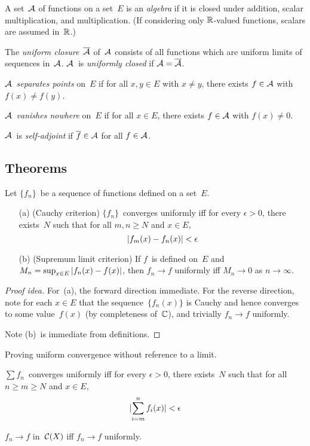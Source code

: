 \begin{defn}
A set~\(\mathcal{A}\) of functions on a set~\(E\) is an \emph{algebra} if it is closed under addition, scalar multiplication, and multiplication. (If considering only \(\mathbb{R}\)-valued functions, scalars are assumed in~\(\mathbb{R}\).)

The \emph{uniform closure}~\(\overline{\mathcal{A}}\) of~\(\mathcal{A}\) consists of all functions which are uniform limits of sequences in~\(\mathcal{A}\). \(\mathcal{A}\)~is \emph{uniformly closed} if \(\mathcal{A}=\overline{\mathcal{A}}\).

\(\mathcal{A}\)~\emph{separates points} on~\(E\) if for all \(x,y\in E\) with \(x\ne y\), there exists \(f\in\mathcal{A}\) with \(f(x)\ne f(y)\).

\(\mathcal{A}\)~\emph{vanishes nowhere} on~\(E\) if for all \(x\in E\), there exists \(f\in\mathcal{A}\) with \(f(x)\ne0\).

\(\mathcal{A}\)~is \emph{self-adjoint} if \(\overline{f}\in\mathcal{A}\) for all \(f\in\mathcal{A}\).
\end{defn}

\subsection*{Theorems}
\begin{thm}
Let \(\{f_n\}\)~be a sequence of functions defined on a set~\(E\).
\begin{enumerate}[itemsep=0pt]
\item[(a)] (Cauchy criterion) \(\{f_n\}\)~converges uniformly iff for every \(\epsilon>0\), there exists~\(N\) such that for all \(m,n\ge N\) and \(x\in E\),
\[|{f_m(x)-f_n(x)}|<\epsilon\]
\item[(b)] (Supremum limit criterion) If \(f\)~is defined on~\(E\) and \(M_n=\sup_{x\in E}|{f_n(x)-f(x)}|\), then \(f_n\to f\) uniformly iff \(M_n\to 0\) as \(n\to\infty\).
\end{enumerate}
\end{thm}
\begin{proof}[Proof idea]
For~(a), the forward direction immediate. For the reverse direction, note for each \(x\in E\) that the sequence~\(\{f_n(x)\}\) is Cauchy and hence converges to some value~\(f(x)\) (by completeness of~\(\mathbb{C}\)), and trivially \(f_n\to f\) uniformly.

Note (b)~is immediate from definitions.
\end{proof}
\begin{app}
Proving uniform convergence without reference to a limit.
\end{app}
\begin{cor}
\(\sum f_n\)~converges uniformly iff for every \(\epsilon>0\), there exists~\(N\) such that for all \(n\ge m\ge N\) and \(x\in E\),
\begin{equation*}
|{\sum_{i=m}^n f_i(x)}|<\epsilon
\end{equation*}
\end{cor}
\begin{cor}
\(f_n\to f\) in~\(\mathcal{C}(X)\) iff \(f_n\to f\) uniformly.
\end{cor}


